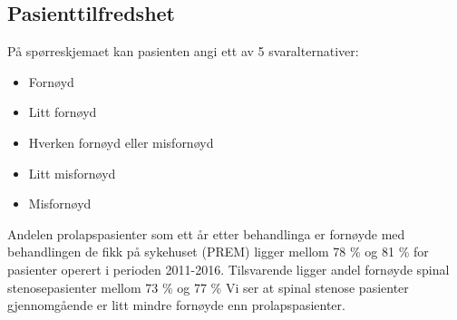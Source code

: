 \documentclass [norsk,a4paper,twoside]{article}\usepackage[]{graphicx}\usepackage[]{color}
\begin{document}
      

\subsection{Pasienttilfredshet}

På spørreskjemaet kan pasienten angi ett av 5 svaralternativer:
      \begin{itemize}
\item Fornøyd
\item Litt fornøyd
\item Hverken fornøyd eller misfornøyd
\item Litt misfornøyd
\item Misfornøyd
\end{itemize} 

Andelen prolapspasienter som ett år etter behandlinga er fornøyde med behandlingen de fikk på sykehuset (PREM) 
ligger mellom 78 \% og 81 \% 
      for pasienter operert i perioden 2011-2016. 
Tilsvarende ligger andel fornøyde spinal stenosepasienter mellom 73 \% 
og 77 \%
Vi ser at spinal stenose pasienter gjennomgående er litt mindre fornøyde enn prolapspasienter.





      
\end{document}
